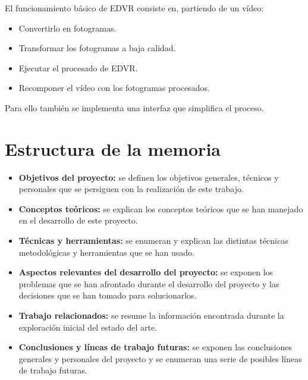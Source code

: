 El funcionamiento básico de EDVR consiste en, partiendo de un  vídeo:

\begin{itemize}
\item Convertirlo en fotogramas.
\item Transformar los fotogramas a baja calidad.
\item Ejecutar el procesado de EDVR.
\item Recomponer el vídeo con los fotogramas procesados. 
\end{itemize}
Para ello también se implementa una interfaz que simplifica el proceso.

\section{Estructura de la memoria}

\begin{itemize}
	\item \textbf{Objetivos del proyecto:} se definen los objetivos generales, técnicos y personales que se persiguen con la realización de este trabajo. 
	\item \textbf{Conceptos teóricos:} se explican los conceptos teóricos que se han manejado en el desarrollo de este proyecto. 
	\item \textbf{Técnicas y herramientas:} se enumeran y explican las distintas técnicas metodológicas y herramientas que se han usado. 
	\item \textbf{Aspectos relevantes del desarrollo del proyecto:} se exponen los problemas que se han afrontado durante el desarrollo del proyecto y las decisiones que se han tomado para solucionarlos. 
	\item \textbf{Trabajo relacionados:} se resume la información encontrada durante la exploración inicial del estado del arte. 
	\item \textbf{Conclusiones y líneas de trabajo futuras:} se exponen las conclusiones generales y personales del proyecto y se enumeran una serie de posibles líneas de trabajo futuras. 
\end{itemize}

